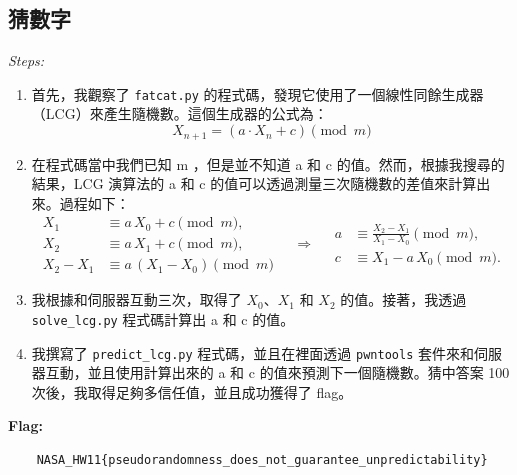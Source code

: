 \documentclass[12pt]{article}
\newenvironment{mycolorbox}[1][gray]{
  \renewmdenv[
    linewidth=2pt, linecolor=#1, backgroundcolor=#1!10,
    topline=false, bottomline=false, rightline=false,
    skipabove=10pt, skipbelow=10pt, innerleftmargin=10pt,
    innerrightmargin=0pt, innertopmargin=5pt, innerbottommargin=5pt
  ]{myquote}
  \begin{myquote}
}{\end{myquote}}
\begin{document}
\subsection{猜數字}
\textit{Steps:}
\begin{enumerate}
  \item 首先，我觀察了 \texttt{fatcat.py} 的程式碼，發現它使用了一個線性同餘生成器（LCG）來產生隨機數。這個生成器的公式為：
  \begin{equation*}
    X_{n+1} = (a \cdot X_n + c) \pmod m
  \end{equation*}
  \item 在程式碼當中我們已知 m ，但是並不知道 a 和 c 的值。然而，根據我搜尋的結果，LCG 演算法的 a 和 c 的值可以透過測量三次隨機數的差值來計算出來。過程如下：
  \begin{equation*}
    \begin{aligned}
      X_1 &\equiv a\,X_0 + c \pmod{m},\\
      X_2 &\equiv a\,X_1 + c \pmod{m},\\
      X_2 - X_1 &\equiv a\,(X_1 - X_0) \pmod{m}
    \end{aligned}
    \quad\Longrightarrow\quad
    \begin{aligned}
      a &\equiv \frac{X_2 - X_1}{X_1 - X_0} \pmod{m},\\
      c &\equiv X_1 - a\,X_0 \pmod{m}.
    \end{aligned}
  \end{equation*}
  \item 我根據和伺服器互動三次，取得了 $X_0$、$X_1$ 和 $X_2$ 的值。接著，我透過 \texttt{solve\_lcg.py} 程式碼計算出 a 和 c 的值。
  \item 我撰寫了 \texttt{predict\_lcg.py} 程式碼，並且在裡面透過 \texttt{pwntools} 套件來和伺服器互動，並且使用計算出來的 a 和 c 的值來預測下一個隨機數。猜中答案 100 次後，我取得足夠多信任值，並且成功獲得了 flag。
\end{enumerate}

\begin{mycolorbox}[green]
  \textbf{Flag:} 
  \begin{verbatim}
    NASA_HW11{pseudorandomness_does_not_guarantee_unpredictability}
  \end{verbatim}
\end{mycolorbox}
\end{document}
